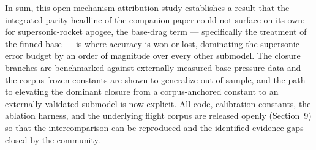 In sum, this open mechanism-attribution study establishes a result that the
integrated parity headline of the companion paper \cite{yu2026jsr} could not
surface on its own: for supersonic-rocket apogee, the base-drag term ---
specifically the treatment of the finned base --- is where accuracy is won or
lost, dominating the supersonic error budget by an order of magnitude over every
other submodel. The closure branches are benchmarked against externally measured
base-pressure data and the corpus-frozen constants are shown to generalize out of
sample, and the path to elevating the dominant closure from a corpus-anchored
constant to an externally validated submodel is now explicit. All code, calibration constants, the ablation harness, and the
underlying flight corpus are released openly (Section~9) so that the
intercomparison can be reproduced and the identified evidence gaps closed by
the community.
